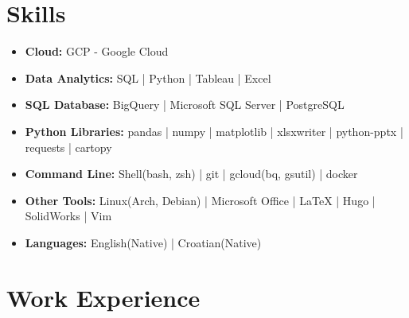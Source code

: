 \documentclass[a4paper,9pt]{article}
\begin{document}
\section*{Skills}
\begin{itemize}[noitemsep]
    \item[] \faCloud \hspace{1mm} \textbf{Cloud:} \hspace{16.7mm} GCP - Google Cloud
    \item[] \faTachometer \hspace{1mm} \textbf{Data Analytics:} \hspace{3.5mm}  SQL |  Python | Tableau |  Excel
    \item[] \faDatabase \hspace{1mm} \textbf{SQL Database:} \hspace{4.4mm} BigQuery |  Microsoft SQL Server |  PostgreSQL
    \item[] \faCog \hspace{1mm} \textbf{Python Libraries:} \hspace{0.4mm} pandas | numpy | matplotlib | xlsxwriter | python-pptx | requests | cartopy
    \item[] \faTerminal \hspace{1mm} \textbf{Command Line:} \hspace{2.5mm} Shell(bash, zsh) | git |  gcloud(bq, gsutil) | docker
    \item[] \faWrench \hspace{1mm} \textbf{Other Tools:} \hspace{8mm}  Linux(Arch, Debian) | Microsoft Office |  LaTeX  | Hugo | SolidWorks | Vim
    \item[] \faLanguage \hspace{1mm} \textbf{Languages:} \hspace{9.5mm} English(Native) |  Croatian(Native)
\end{itemize}

\section*{Work Experience}
\end{document}
